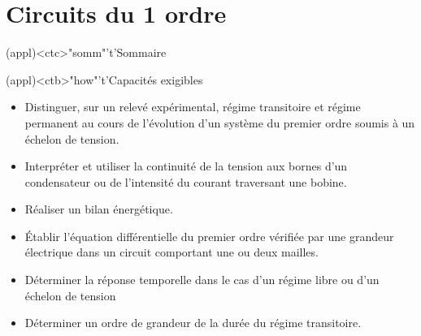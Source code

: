 \documentclass[../../main/main.tex]{subfiles}
\begin{document}
\setcounter{chapter}{2}


\chapter{Circuits du 1\ier{} ordre}

\vspace*{\fill}

\begin{tcn}(appl)<ctc>"somm"'t'{Sommaire}
	\let\item\olditem
	\vspace{-15pt}
	\minitoc
	\vspace{-25pt}
\end{tcn}

\begin{tcn}[sidebyside](appl)<ctb>"how"'t'{Capacités exigibles}
	\begin{itemize}[label=\rcheck]
		\item Distinguer, sur un relevé expérimental, régime transitoire et
		      régime permanent au cours de l'évolution d'un système du premier
		      ordre soumis à un échelon de tension.
		\item Interpréter et utiliser la continuité de la tension aux bornes d'un
		      condensateur ou de l'intensité du courant traversant une bobine.
		\item Réaliser un bilan énergétique.
	\end{itemize}
	\tcblower
	\begin{itemize}[label=\rcheck]
		\item Établir l'équation différentielle du premier ordre vérifiée par une
		      grandeur électrique dans un circuit comportant une ou deux mailles.
		\item Déterminer la réponse temporelle dans le cas d'un régime libre ou
		      d'un échelon de tension
		\item Déterminer un ordre de grandeur de la durée du régime transitoire.
	\end{itemize}
\end{tcn}

\vspace*{\fill}
\newpage
\vspace*{\fill}
\end{document}
